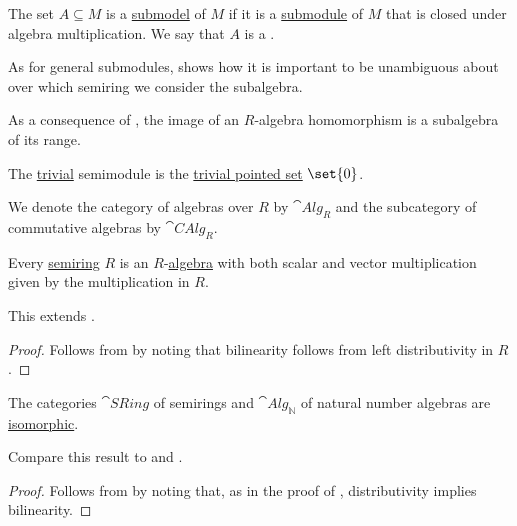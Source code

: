 \begin{definition}
\begin{thmenum}
     The set \( A \subseteq M \) is a \hyperref[thm:substructure_is_model]{submodel} of \( M \) if it is a \hyperref[def:monoid/submodel]{submodule} of \( M \) that is closed under algebra multiplication. We say that \( A \) is a .

    As for general submodules,  shows how it is important to be unambiguous about over which semiring we consider the subalgebra.

    As a consequence of , the image of an \( R \)-algebra homomorphism is a subalgebra of its range.

     The \hyperref[thm:substructures_form_complete_lattice/bottom]{trivial} semimodule is the \hyperref[def:pointed_set/trivial]{trivial pointed set} \( \set{ 0 } \).

     We denote the category of algebras over \( R \) by \( \cat{Alg}_R \) and the subcategory of commutative algebras by \( \cat{CAlg}_R \).
  \end{thmenum}
\end{definition}

\begin{proposition}\label{thm:semiring_is_algebra}
  Every \hyperref[def:semiring]{semiring} \( R \) is an \( R \)-\hyperref[def:algebra_over_semiring]{algebra} with both scalar and vector multiplication given by the multiplication in \( R \).

  This extends .
\end{proposition}
\begin{proof}
  Follows from  by noting that bilinearity follows from left distributivity in \( R \).
\end{proof}

\begin{proposition}\label{thm:semiring_is_natural_number_algebra}
  The categories \( \hyperref[def:semiring/category]{\cat{SRing}} \) of semirings and \( \hyperref[def:algebra_over_semiring/category]{\cat{Alg}_\BbbN} \) of natural number algebras are \hyperref[rem:category_similarity/isomorphism]{isomorphic}.

  Compare this result to  and .
\end{proposition}
\begin{proof}
  Follows from  by noting that, as in the proof of , distributivity implies bilinearity.
\end{proof}

